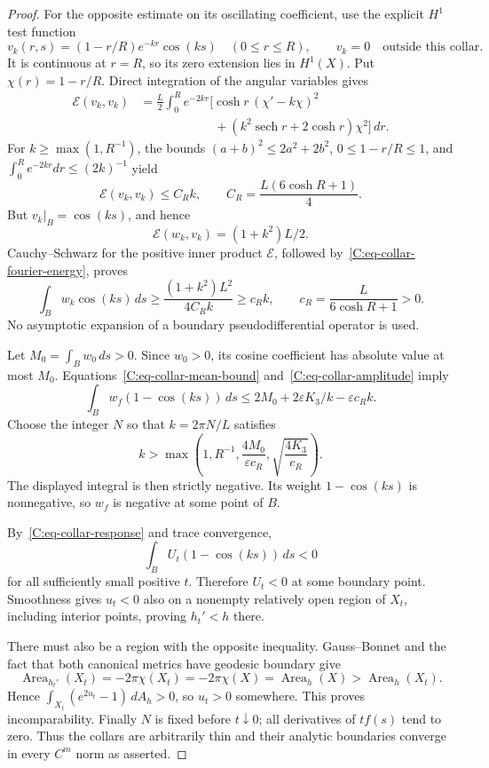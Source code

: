 \begin{proof}
For the opposite estimate on its oscillating coefficient, use the explicit $H^1$ test function
\[
 v_k(r,s)=(1-r/R)e^{-kr}\cos(ks)\quad(0\le r\le R),
 \qquad v_k=0\quad\text{outside this collar}.
\]
It is continuous at $r=R$, so its zero extension lies in $H^1(X)$. Put $\chi(r)=1-r/R$. Direct integration of the angular variables gives
\[
\begin{aligned}
 \mathcal E(v_k,v_k)
 &=\frac L2\int_0^R e^{-2kr}
       \bigl[\cosh r\,(\chi'-k\chi)^2\\
 &\hspace{6em}+(k^2\operatorname{sech}r+2\cosh r)\chi^2\bigr]\,dr.
\end{aligned}
\]
For $k\ge\max(1,R^{-1})$, the bounds $(a+b)^2\le2a^2+2b^2$, $0\le1-r/R\le1$, and $\int_0^R e^{-2kr}dr\le(2k)^{-1}$ yield
\[
 \mathcal E(v_k,v_k)\le C_R k,
 \qquad C_R=\frac{L(6\cosh R+1)}4.
\]
But $v_k|_B=\cos(ks)$, and hence
\[
 \mathcal E(w_k,v_k)=(1+k^2)L/2.
\]
Cauchy--Schwarz for the positive inner product $\mathcal E$, followed by~\eqref{C:eq-collar-fourier-energy}, proves
\begin{equation}
 \int_Bw_k\cos(ks)\,ds
 \ge\frac{(1+k^2)L^2}{4C_Rk}
 \ge c_Rk,
 \qquad c_R=\frac{L}{6\cosh R+1}>0.
 \label{C:eq-collar-amplitude}
\end{equation}
No asymptotic expansion of a boundary pseudodifferential operator is used.

Let $M_0=\int_Bw_0\,ds>0$. Since $w_0>0$, its cosine coefficient has absolute value at most $M_0$. Equations~\eqref{C:eq-collar-mean-bound} and~\eqref{C:eq-collar-amplitude} imply
\[
 \int_B w_f(1-\cos(ks))\,ds
 \le2M_0+2\varepsilon K_3/k-\varepsilon c_Rk.
\]
Choose the integer $N$ so that $k=2\pi N/L$ satisfies
\[
 k>\max\left(1,R^{-1},\frac{4M_0}{\varepsilon c_R},
                        \sqrt{\frac{4K_3}{c_R}}\right).
\]
The displayed integral is then strictly negative. Its weight $1-\cos(ks)$ is nonnegative, so $w_f$ is negative at some point of $B$.

By~\eqref{C:eq-collar-response} and trace convergence,
\[
 \int_B U_t(1-\cos(ks))\,ds<0
\]
for all sufficiently small positive $t$. Therefore $U_t<0$ at some boundary point. Smoothness gives $u_t<0$ also on a nonempty relatively open region of $X_t$, including interior points, proving $h_t'<h$ there.

There must also be a region with the opposite inequality. Gauss--Bonnet and the fact that both canonical metrics have geodesic boundary give
\[
 \operatorname{Area}_{h_t'}(X_t)
  =-2\pi\chi(X_t)=-2\pi\chi(X)
  =\operatorname{Area}_h(X)
  >\operatorname{Area}_h(X_t).
\]
Hence $\int_{X_t}(e^{2u_t}-1)\,dA_h>0$, so $u_t>0$ somewhere. This proves incomparability. Finally $N$ is fixed before $t\downarrow0$; all derivatives of $tf(s)$ tend to zero. Thus the collars are arbitrarily thin and their analytic boundaries converge in every $C^m$ norm as asserted.
\end{proof}

